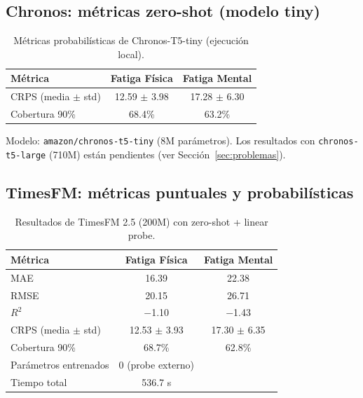 \documentclass[12pt, a4paper]{article}
\newcommand{\code}[1]{\texttt{#1}}
\begin{document}
\subsection{Chronos: métricas zero-shot (modelo tiny)}

\begin{table}[H]
\centering
\caption{Métricas probabilísticas de Chronos-T5-tiny (ejecución local).}
\label{tab:chronos_metricas}
\small
\begin{tabular}{@{}lcc@{}}
\toprule
\textbf{Métrica} & \textbf{Fatiga Física} & \textbf{Fatiga Mental} \\
\midrule
CRPS (media $\pm$ std) & 12.59 $\pm$ 3.98 & 17.28 $\pm$ 6.30 \\
Cobertura 90\% & 68.4\% & 63.2\% \\
\bottomrule
\end{tabular}
\begin{flushleft}
\footnotesize
Modelo: \code{amazon/chronos-t5-tiny} (8M parámetros). Los resultados con \code{chronos-t5-large} (710M) están pendientes (ver Sección~\ref{sec:problemas}).
\end{flushleft}
\end{table}


\subsection{TimesFM: métricas puntuales y probabilísticas}

\begin{table}[H]
\centering
\caption{Resultados de TimesFM 2.5 (200M) con zero-shot + linear probe.}
\label{tab:timesfm_resultados}
\small
\begin{tabular}{@{}lcc@{}}
\toprule
\textbf{Métrica} & \textbf{Fatiga Física} & \textbf{Fatiga Mental} \\
\midrule
MAE & 16.39 & 22.38 \\
RMSE & 20.15 & 26.71 \\
$R^2$ & $-$1.10 & $-$1.43 \\
\midrule
CRPS (media $\pm$ std) & 12.53 $\pm$ 3.93 & 17.30 $\pm$ 6.35 \\
Cobertura 90\% & 68.7\% & 62.8\% \\
\midrule
Parámetros entrenados & 0 (probe externo) & \\
Tiempo total & 536.7 s & \\
\bottomrule
\end{tabular}
\end{table}
\end{document}
